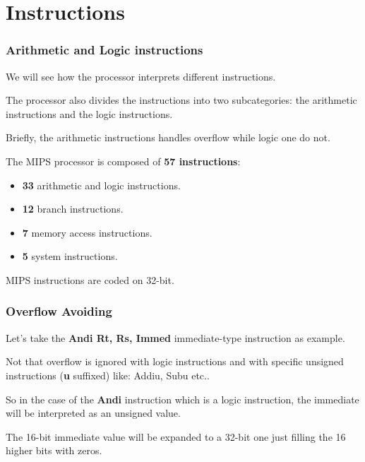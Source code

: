 %
%

\section{Instructions}


\begin{frame}
  \frametitle{Arithmetic and Logic instructions}

  We will see how the processor interprets different instructions.

  \nl

  The processor also divides the instructions into two subcategories:
  the arithmetic instructions and the logic instructions.

  \nl

  Briefly, the arithmetic instructions handles overflow while logic
  one do not.

  \nl

  The MIPS processor is composed of \textbf{57 instructions}:

  \begin{itemize}[<+->]
    \item
      \textbf{33} arithmetic and logic instructions.
    \item
      \textbf{12} branch instructions.
    \item
      \textbf{7} memory access instructions.
    \item
      \textbf{5} system instructions.
  \end{itemize}

  \nl

  MIPS instructions are coded on 32-bit.
\end{frame}


\begin{frame}
  \frametitle{Overflow Avoiding}

  Let's take the \textbf{Andi Rt, Rs, Immed} immediate-type
  instruction as example.

  \nl

  Not that overflow is ignored with logic instructions and with
  specific unsigned instructions (\textbf{u} suffixed) like:
  Addiu, Subu etc..

  \nl

  So in the case of the \textbf{Andi} instruction which is a logic
  instruction, the immediate will be interpreted as an unsigned value.

  \nl

  The 16-bit immediate value will be expanded to a 32-bit one just
  filling the 16 higher bits with zeros.

  \begin{center}
  \end{center}
\end{frame}


